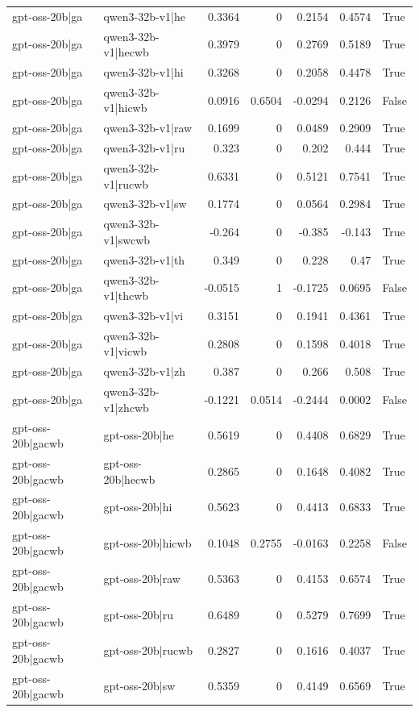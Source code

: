 \begin{table}
\begin{tabular}{l l r r r r l}
gpt-oss-20b|ga & qwen3-32b-v1|he & 0.3364 & 0 & 0.2154 & 0.4574 & True \\
gpt-oss-20b|ga & qwen3-32b-v1|hecwb & 0.3979 & 0 & 0.2769 & 0.5189 & True \\
gpt-oss-20b|ga & qwen3-32b-v1|hi & 0.3268 & 0 & 0.2058 & 0.4478 & True \\
gpt-oss-20b|ga & qwen3-32b-v1|hicwb & 0.0916 & 0.6504 & -0.0294 & 0.2126 & False \\
gpt-oss-20b|ga & qwen3-32b-v1|raw & 0.1699 & 0 & 0.0489 & 0.2909 & True \\
gpt-oss-20b|ga & qwen3-32b-v1|ru & 0.323 & 0 & 0.202 & 0.444 & True \\
gpt-oss-20b|ga & qwen3-32b-v1|rucwb & 0.6331 & 0 & 0.5121 & 0.7541 & True \\
gpt-oss-20b|ga & qwen3-32b-v1|sw & 0.1774 & 0 & 0.0564 & 0.2984 & True \\
gpt-oss-20b|ga & qwen3-32b-v1|swcwb & -0.264 & 0 & -0.385 & -0.143 & True \\
gpt-oss-20b|ga & qwen3-32b-v1|th & 0.349 & 0 & 0.228 & 0.47 & True \\
gpt-oss-20b|ga & qwen3-32b-v1|thcwb & -0.0515 & 1 & -0.1725 & 0.0695 & False \\
gpt-oss-20b|ga & qwen3-32b-v1|vi & 0.3151 & 0 & 0.1941 & 0.4361 & True \\
gpt-oss-20b|ga & qwen3-32b-v1|vicwb & 0.2808 & 0 & 0.1598 & 0.4018 & True \\
gpt-oss-20b|ga & qwen3-32b-v1|zh & 0.387 & 0 & 0.266 & 0.508 & True \\
gpt-oss-20b|ga & qwen3-32b-v1|zhcwb & -0.1221 & 0.0514 & -0.2444 & 0.0002 & False \\
gpt-oss-20b|gacwb & gpt-oss-20b|he & 0.5619 & 0 & 0.4408 & 0.6829 & True \\
gpt-oss-20b|gacwb & gpt-oss-20b|hecwb & 0.2865 & 0 & 0.1648 & 0.4082 & True \\
gpt-oss-20b|gacwb & gpt-oss-20b|hi & 0.5623 & 0 & 0.4413 & 0.6833 & True \\
gpt-oss-20b|gacwb & gpt-oss-20b|hicwb & 0.1048 & 0.2755 & -0.0163 & 0.2258 & False \\
gpt-oss-20b|gacwb & gpt-oss-20b|raw & 0.5363 & 0 & 0.4153 & 0.6574 & True \\
gpt-oss-20b|gacwb & gpt-oss-20b|ru & 0.6489 & 0 & 0.5279 & 0.7699 & True \\
gpt-oss-20b|gacwb & gpt-oss-20b|rucwb & 0.2827 & 0 & 0.1616 & 0.4037 & True \\
gpt-oss-20b|gacwb & gpt-oss-20b|sw & 0.5359 & 0 & 0.4149 & 0.6569 & True \\

\end{tabular}
\end{table}
